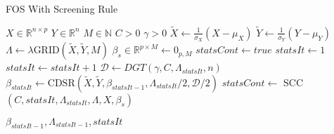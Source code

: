 \documentclass[letterpaper,11pt]{article}
\begin{document}
\FloatBarrier
\begin{algorithm}[!htbp]
  \caption{FOS With Screening Rule}
  \begin{algorithmic}[1]
  \Statex
  \Input{}
  \Statex $X \in \mathbb{R}^{n \times p} $ 
  \Statex $Y \in \mathbb{R}^n$  
  \Statex $M \in \mathbb{N}$  
  \Statex $C > 0$
  \Statex $\gamma > 0$
    \State $\widetilde{X} \gets \frac{1}{\sigma_X}\left( X - \mu_X \right)$ 
    \State $\widetilde{Y} \gets \frac{1}{\sigma_Y} \left( Y - \mu_Y \right)$ 
    \State $\Lambda \gets \lambda$GRID$( \widetilde{X}, \widetilde{Y}, M )$ 
    \State $\beta_s \in \mathbb{R}^{ p \times M } \gets 0_{p,M}$ 
    \State $statsCont \gets true$
    \State $statsIt \gets 1$
        \State $statsIt \gets statsIt + 1$
        \State $\mathcal{D} \gets DGT( \gamma, C, \Lambda_{statsIt}, n )$           
        \State $\beta_{statsIt} \gets \text{CDSR}( \widetilde{X}, \widetilde{Y}, \beta_{statsIt-1}, \Lambda_{statsIt}/2, \mathcal{D}/2 )$
        \State $statsCont \gets$ SCC $( C, statsIt, \Lambda_{statsIt}, \Lambda, X, \beta_s )$
      \EndWhile
  \end{algorithmic}
  \Return $\beta_{statsIt-1}, \Lambda_{statsIt-1}, statsIt$
\end{algorithm}
\FloatBarrier
\end{document}
